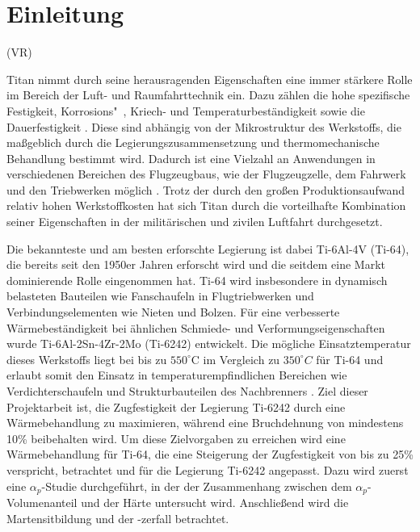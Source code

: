 \chapter{Einleitung} 

(VR)

Titan nimmt durch seine herausragenden Eigenschaften eine immer stärkere Rolle im Bereich der Luft- und Raumfahrttechnik ein. Dazu zählen die hohe spezifische Festigkeit, Korrosions"~, Kriech- und Temperaturbeständigkeit sowie die Dauerfestigkeit \cite{Lutjering.2007}. Diese sind abhängig von der Mikrostruktur des Werkstoffs, die maßgeblich durch die Legierungszusammensetzung und thermomechanische Behandlung bestimmt wird. Dadurch ist eine Vielzahl an Anwendungen in verschiedenen Bereichen des Flugzeugbaus, wie der Flugzeugzelle, dem Fahrwerk und den Triebwerken möglich \cite{M.J.Donachie.2010}. Trotz der durch den großen Produktionsaufwand relativ hohen Werkstoffkosten hat sich Titan durch die vorteilhafte Kombination seiner Eigenschaften in der militärischen und zivilen Luftfahrt durchgesetzt. 

Die bekannteste und am besten erforschte Legierung ist dabei Ti-6Al-4V (Ti-64), die bereits seit den 1950er Jahren erforscht wird und die seitdem eine Markt dominierende Rolle eingenommen hat. Ti-64 wird insbesondere in dynamisch belasteten Bauteilen wie Fanschaufeln in Flugtriebwerken und Verbindungselementen wie Nieten und Bolzen. 
Für eine verbesserte Wärmebeständigkeit bei ähnlichen Schmiede- und Verformungseigenschaften wurde Ti-6Al-2Sn-4Zr-2Mo (Ti-6242) entwickelt. Die mögliche Einsatztemperatur dieses Werkstoffs liegt bei bis zu $550^\circ $C im Vergleich zu $350^\circ C$ für Ti-64 und erlaubt somit den Einsatz in temperaturempfindlichen Bereichen wie Verdichterschaufeln und Strukturbauteilen des Nachbrenners \cite{Lutjering.2007}. 
Ziel dieser Projektarbeit ist, die Zugfestigkeit der Legierung Ti-6242 durch eine Wärmebehandlung zu maximieren, während eine Bruchdehnung von mindestens 10\% beibehalten wird. Um diese Zielvorgaben zu erreichen wird eine Wärmebehandlung für Ti-64, die eine Steigerung der Zugfestigkeit von bis zu 25\% verspricht, betrachtet und für die Legierung Ti-6242 angepasst. Dazu wird zuerst eine $\alpha_p$-Studie durchgeführt, in der der Zusammenhang zwischen dem $\alpha_p$-Volumenanteil und der Härte untersucht wird. Anschließend wird die Martensitbildung und der -zerfall betrachtet. 


